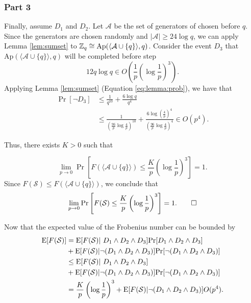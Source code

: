 \subsubsection*{Part 3}

\par Finally, assume $D_1$ and $D_2$. Let $\mathcal{A}$ be the set of generators of chosen before $q$. Since the generators are chosen randomly and $|\mathcal{A}| \geq 24\log q$, we can apply Lemma \ref{lem:sumset} to $\ZZ_q \cong \mathrm{Ap}(\langle\mathcal{A}\cup\{q\}\rangle, q)$. Consider the event $D_3$ that $\mathrm{Ap}(\langle\mathcal{A}\cup\{q\}\rangle, q)$ will be completed before step \[ 12q\log q \in O\left(\frac{1}{p}\left(\log \frac{1}{p}\right)^3\right).\] 
Applying Lemma \ref{lem:sumset} (Equation \ref{eq:lemma:prob}), we have that
\begin{align*}
\Pr[\lnot D_3] &\leq \frac{1}{q^{10}} + \frac{6\log q}{q^4} \\
&\leq \frac{1}{\left(\frac{96}{p}\log \frac{4}{p}\right)^{10}}
+ \frac{6\log\left(\frac{4}{p}\right)^4}{\left(\frac{96}{p}\log\frac{4}{p}\right)^4} \in O(p^4).
\end{align*}
\par 

Thus, there exists $K > 0$ such that 

\[\lim_{p \to  0} \Pr\left[F(\langle\mathcal{A}\cup \{q\}\rangle) \leq \frac{K}{p}\left(\log \frac{1}{p}\right)^3\right] = 1.\]
Since $F(\mathcal{S}) \leq F(\langle \mathcal{A}\cup\{q\}\rangle)$, we conclude that
\[\lim_{p \to 0}\Pr\left[F(\mathcal{S}) \leq \frac{K}{p}\left(\log \frac{1}{p}\right)^3\right] = 1.\qed\]

Now that the expected value of the Frobenius number can be bounded by
\begin{align*}
\EE[F(\mathcal{S})] &= \EE[F(\mathcal{S}) | D_1 \land D_2 \land D_3] \Pr[D_1 \land D_2 \land D_3]
\\&+ \EE[F(\mathcal{S}) |\lnot(D_1 \land D_2 \land D_3)] \Pr[\lnot(D_1 \land D_2 \land D_3)] 
\\&\leq \EE[F(\mathcal{S}) | D_1 \land D_2 \land D_3] 
\\&+ \EE[F(\mathcal{S}) |\lnot(D_1 \land D_2 \land D_3)] \Pr[\lnot(D_1 \land D_2 \land D_3)]
\\&= \frac{K}{p}\left(\log \frac{1}{p}\right)^3 + \EE[F(\mathcal{S}) |\lnot(D_1 \land D_2 \land D_3)]O(p^4).
\end{align*}

